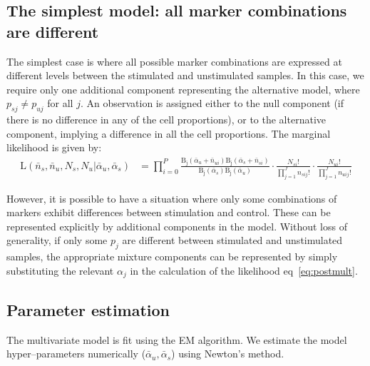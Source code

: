 \documentclass[11pt]{article}
\begin{document}
\subsection{The simplest model: all marker combinations are different}
The simplest case is where all possible marker combinations are expressed at different levels between the stimulated and unstimulated samples. In this case, we require only one additional component representing the alternative model, where $p_{sj} \ne p_{uj}$ for all $j$. An observation is assigned either to the null component (if there is no difference in any of the cell proportions), or to the alternative component, implying a difference in all the cell proportions. The marginal likelihood is given by:
\begin{align}
\mathrm{L}(\bar{n}_s,\bar{n}_u,N_s,N_u|\bar{\alpha}_u,\bar{\alpha}_s) &= \prod_{i=0}^P\frac{  \mathrm{B_j}(\bar{\alpha}_{u}+\bar{n}_{ui}) \mathrm{B_j}(\bar{\alpha}_{s}+\bar{n}_{si})}{\mathrm{B_j}(\bar{\alpha}_s)\mathrm{B_j}(\bar{\alpha}_u)} \cdot \frac{N_{si}!}{\prod_{j=1}^J n_{sij}!} \cdot \frac{N_{ui}!}{\prod_{j=1}^J n_{uij}!}\label{eq:postmult}
\end{align}

However, it is possible to have a situation where only some combinations of markers exhibit differences between stimulation and control. These can be represented explicitly by additional components in the model. Without loss of generality, if only some $p_j$ are different between stimulated and unstimulated samples, the appropriate mixture components can be represented by simply substituting the relevant $\alpha_j$ in the calculation of the likelihood eq~\eqref{eq:postmult}.

\subsection{Parameter estimation}
The multivariate model is fit using the EM algorithm. We estimate the model hyper--parameters numerically ($\bar{\alpha}_u,\bar{\alpha}_s$) using Newton's method. 
\end{document}
